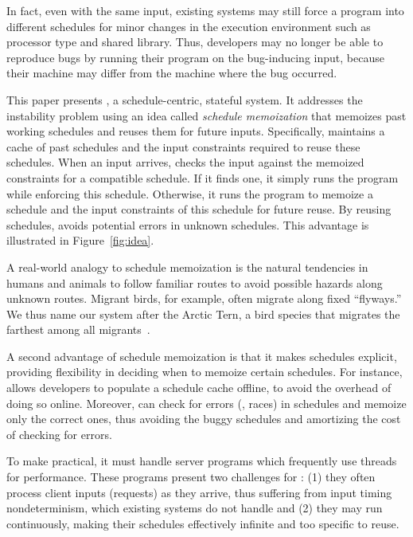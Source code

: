 In fact, even with the same input, existing \dmt systems may still force a
program into different schedules for minor changes in the execution
environment such as processor type and shared library.  Thus,
developers may no longer be able to reproduce bugs by running their
program on the bug-inducing input, because their machine may differ from
the machine where the bug occurred.

This paper presents \tern, a schedule-centric, stateful \dmt system.  It
addresses the instability problem using an idea called \emph{schedule
  memoization} that memoizes past working schedules and reuses them for
future inputs.  Specifically, \tern maintains a cache of past schedules and
the input constraints required to reuse these schedules.  When an input arrives,
\tern checks the input against the memoized constraints for a compatible
schedule.  If it finds one, it simply runs the program while enforcing
this schedule.  Otherwise, it runs the program to memoize a schedule and
the input constraints of this schedule for future reuse.  By reusing
schedules, \tern avoids potential errors in unknown schedules.  This
advantage is illustrated in Figure~\ref{fig:idea}.


A real-world analogy to schedule memoization is the natural tendencies in
humans and animals to follow familiar routes to avoid possible hazards
along unknown routes.  Migrant birds, for example, often migrate along
fixed ``flyways.''  We thus name our system after the Arctic Tern, a bird
species that migrates the farthest among all migrants~\cite{artic-tern-wiki}.  

A second advantage of schedule memoization is that it makes schedules
explicit, providing flexibility in deciding when to memoize certain
schedules.  For instance, \tern allows developers to populate a schedule
cache offline, to avoid the overhead of doing so online.  Moreover,
\tern can check for errors (\eg, races) in schedules and memoize only the
correct ones, thus avoiding the buggy schedules and amortizing the
cost of checking for errors.

To make \tern practical, it must handle server programs which frequently
use threads for performance.  These programs present two challenges for
\tern: (1) they often process client inputs (requests) as they arrive, thus
suffering from input timing nondeterminism, which existing \dmt systems do
not handle and (2) they may run continuously, making their schedules
effectively infinite and too specific to reuse.

